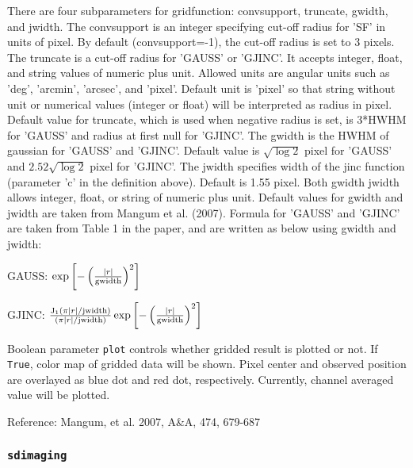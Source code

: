 There are four subparameters for gridfunction: convsupport, truncate, 
gwidth, and jwidth. The convsupport is an integer specifying cut-off 
radius for 'SF' in units of pixel. By default (convsupport=-1), 
the cut-off radius is set to 3 pixels. The truncate is a cut-off 
radius for 'GAUSS' or 'GJINC'. It accepts integer, float, and 
string values of numeric plus unit. Allowed units are angular 
units such as 'deg', 'arcmin', 'arcsec', and 'pixel'. Default unit 
is 'pixel' so that string without unit or numerical values (integer 
or float) will be interpreted as radius in pixel. Default value 
for truncate, which is used when negative radius is set, is 3*HWHM 
for 'GAUSS' and radius at first null for 'GJINC'. The gwidth is 
the HWHM of gaussian for 'GAUSS' and 'GJINC'. Default value is 
$\sqrt{\log 2}$ pixel for 'GAUSS' and $2.52 \sqrt{\log 2}$ pixel for 
'GJINC'. The jwidth specifies width of the jinc function (parameter 
'c' in the definition above). Default is 1.55 pixel. Both gwidth 
jwidth allows integer, float, or string of numeric plus unit. 
Default values for gwidth and jwidth are taken from Mangum et al. 
(2007). Formula for 'GAUSS' and 'GJINC' are taken from Table 1 in 
the paper, and are written as below using gwidth and jwidth: 

   GAUSS: $ \exp \left[ - \left( \frac{|r|}{\rm gwidth} \right)^2 \right] $

   GJINC: $ \frac{ {\rm J}_1 \left( \pi |r| / {\rm jwidth} \right)}{\left( \pi |r| / {\rm jwidth} \right)} \exp \left[ - \left( \frac{|r|}{\rm gwidth} \right)^2 \right] $  


Boolean parameter {\tt plot} controls whether gridded result is plotted 
or not. If {\tt True}, color map of gridded data will be shown. Pixel 
center and observed position are overlayed as blue dot and red dot, 
respectively. Currently, channel averaged value will be plotted.

Reference: Mangum, et al. 2007, A\&A, 474, 679-687 


\subsubsection{{\tt sdimaging}}
\label{section:sd.sdtasks.tasks.sdimaging}

